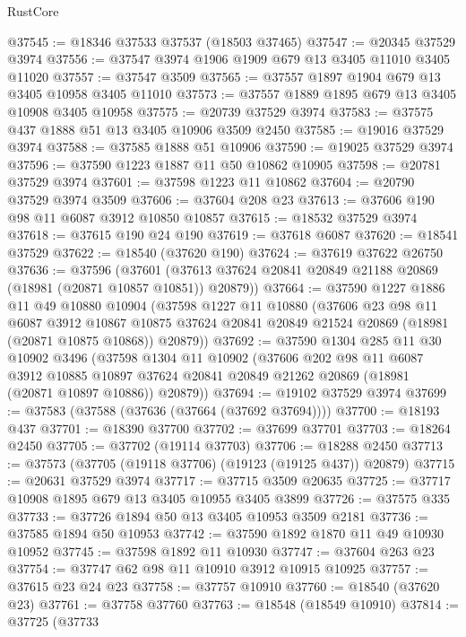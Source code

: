 \begin{lexlean}{RustCore}
\begin{coremodule}
@37545 := @18346 @37533 @37537 (@18503 @37465)
@37547 := @20345 @37529 @3974
@37556 := @37547 @3974 @1906 @1909 @679 @13 @3405 @11010 @3405 @11020
@37557 := @37547 @3509
@37565 := @37557 @1897 @1904 @679 @13 @3405 @10958 @3405 @11010
@37573 := @37557 @1889 @1895 @679 @13 @3405 @10908 @3405 @10958
@37575 := @20739 @37529 @3974
@37583 := @37575 @437 @1888 @51 @13 @3405 @10906 @3509 @2450
@37585 := @19016 @37529 @3974
@37588 := @37585 @1888 @51 @10906
@37590 := @19025 @37529 @3974
@37596 := @37590 @1223 @1887 @11 @50 @10862 @10905
@37598 := @20781 @37529 @3974
@37601 := @37598 @1223 @11 @10862
@37604 := @20790 @37529 @3974 @3509
@37606 := @37604 @208 @23
@37613 := @37606 @190 @98 @11 @6087 @3912 @10850 @10857
@37615 := @18532 @37529 @3974
@37618 := @37615 @190 @24 @190
@37619 := @37618 @6087
@37620 := @18541 @37529
@37622 := @18540 (@37620 @190)
@37624 := @37619 @37622 @26750
@37636 := @37596
    (@37601 (@37613 @37624 @20841 @20849 @21188 @20869 (@18981 (@20871 @10857 @10851)) @20879))
@37664 := @37590
    @1227
    @1886
    @11
    @49
    @10880
    @10904
    (@37598
      @1227
      @11
      @10880
      (@37606
        @23
        @98
        @11
        @6087
        @3912
        @10867
        @10875
        @37624
        @20841
        @20849
        @21524
        @20869
        (@18981 (@20871 @10875 @10868))
        @20879))
@37692 := @37590
    @1304
    @285
    @11
    @30
    @10902
    @3496
    (@37598
      @1304
      @11
      @10902
      (@37606
        @202
        @98
        @11
        @6087
        @3912
        @10885
        @10897
        @37624
        @20841
        @20849
        @21262
        @20869
        (@18981 (@20871 @10897 @10886))
        @20879))
@37694 := @19102 @37529 @3974
@37699 := @37583 (@37588 (@37636 (@37664 (@37692 @37694))))
@37700 := @18193 @437
@37701 := @18390 @37700
@37702 := @37699 @37701
@37703 := @18264 @2450
@37705 := @37702 (@19114 @37703)
@37706 := @18288 @2450
@37713 := @37573 (@37705 (@19118 @37706) (@19123 (@19125 @437)) @20879)
@37715 := @20631 @37529 @3974
@37717 := @37715 @3509 @20635
@37725 := @37717 @10908 @1895 @679 @13 @3405 @10955 @3405 @3899
@37726 := @37575 @335
@37733 := @37726 @1894 @50 @13 @3405 @10953 @3509 @2181
@37736 := @37585 @1894 @50 @10953
@37742 := @37590 @1892 @1870 @11 @49 @10930 @10952
@37745 := @37598 @1892 @11 @10930
@37747 := @37604 @263 @23
@37754 := @37747 @62 @98 @11 @10910 @3912 @10915 @10925
@37757 := @37615 @23 @24 @23
@37758 := @37757 @10910
@37760 := @18540 (@37620 @23)
@37761 := @37758 @37760
@37763 := @18548 (@18549 @10910)
@37814 := @37725
    (@37733

\end{coremodule}
\end{lexlean}
